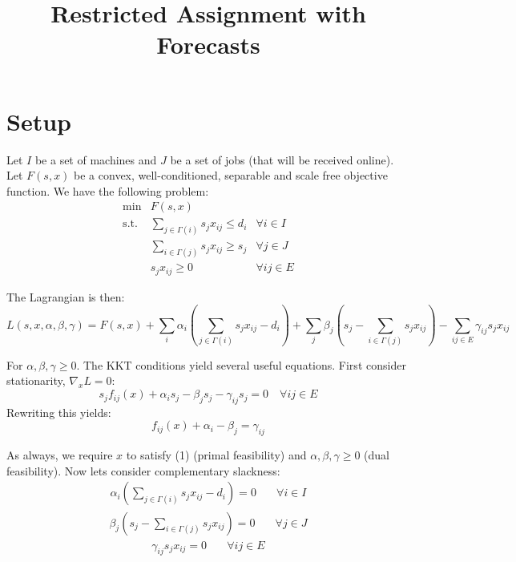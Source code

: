 \documentclass[11pt]{article}
\title{Restricted Assignment with Forecasts}
\begin{document}
\maketitle

\section{Setup}
Let $I$ be a set of machines and $J$ be a set of jobs (that will be received online).  Let $F(s,x)$ be a convex, well-conditioned, separable and scale free objective function.  We have the following problem:
\begin{equation} \begin{array}{ccc}
\min & F(s,x) & \\
\text{s.t.} & \displaystyle\sum_{j \in \Gamma(i)} s_j x_{ij} \leq d_i & \forall i \in I \\
            & \displaystyle\sum_{i \in \Gamma(j)} s_j x_{ij} \geq s_j & \forall j \in J \\
 			& s_j x_{ij} \geq 0 & \forall ij \in E
\end{array} \end{equation}

The Lagrangian is then:
\[
L(s,x,\alpha,\beta,\gamma) = F(s,x) + \sum_{i} \alpha_i \left( \sum_{j \in \Gamma(i)} s_j x_{ij} - d_i \right) + \sum_{j} \beta_{j} \left( s_j - \sum_{i \in \Gamma(j)} s_{j} x_{ij} \right) - \sum_{ij \in E} \gamma_{ij} s_j x_{ij}
\]

For $\alpha, \beta, \gamma \geq 0$.  The KKT conditions yield several useful equations.  First consider stationarity, $\nabla_{x} L = 0$:
\[
s_{j} f_{ij}(x) + \alpha_i s_j  - \beta_j s_j - \gamma_{ij}s_j = 0 \quad \forall ij \in E
\]
Rewriting this yields:
\begin{equation}
f_{ij}(x) + \alpha_i - \beta_j = \gamma_{ij}
\end{equation}

As always, we require $x$ to satisfy (1) (primal feasibility) and $\alpha,\beta, \gamma \geq 0$ (dual feasibility).  Now lets consider complementary slackness:
\begin{equation} \begin{split}
\alpha_{i} \left( \sum_{j \in \Gamma(i)} s_j x_{ij} - d_i \right) = 0 \quad & \forall i \in I
\end{split}\end{equation}
\begin{equation} \begin{split}
\beta_{j} \left( s_j - \sum_{i \in \Gamma(j)} s_{j} x_{ij} \right) = 0 \quad & \forall j \in J 
\end{split} \end{equation}
\begin{equation} \begin{split}
 \gamma_{ij} s_jx_{ij}  = 0 \quad & \forall ij \in E  
\end{split} \end{equation}
\end{document}
